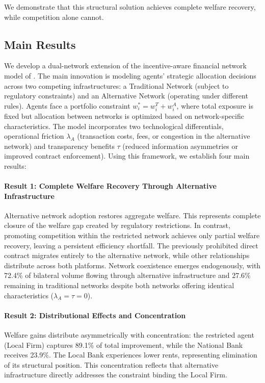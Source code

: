 \documentclass[12pt]{article}
\begin{document}
We demonstrate that this structural solution achieves complete welfare recovery, while competition alone cannot.

\subsection{Main Results}

We develop a dual-network extension of the incentive-aware financial network model of \citet{jalan_incentive-aware_2024}. The main innovation is modeling agents' strategic allocation decisions across two competing infrastructures: a Traditional Network (subject to regulatory constraints) and an Alternative Network (operating under different rules). Agents face a portfolio constraint $w_i^* = w_i^T + w_i^A$, where total exposure is fixed but allocation between networks is optimized based on network-specific characteristics. The model incorporates two technological differentials, operational friction $\lambda_A$ (transaction costs, fees, or congestion in the alternative network) and transparency benefits $\tau$ (reduced information asymmetries or improved contract enforcement). Using this framework, we establish four main results:

\paragraph{Result 1: Complete Welfare Recovery Through Alternative Infrastructure}

Alternative network adoption restores aggregate welfare. This represents complete closure of the welfare gap created by regulatory restrictions. In contrast, promoting competition within the restricted network achieves only partial welfare recovery, leaving a persistent efficiency shortfall. The previously prohibited direct contract migrates entirely to the alternative network, while other relationships distribute across both platforms. Network coexistence emerges endogenously, with 72.4\% of bilateral volume flowing through alternative infrastructure and 27.6\% remaining in traditional networks despite both networks offering identical characteristics ($\lambda_A = \tau = 0$).

\paragraph{Result 2: Distributional Effects and Concentration}

Welfare gains distribute asymmetrically with concentration: the restricted agent (Local Firm) captures 89.1\% of total improvement, while the National Bank receives 23.9\%. The Local Bank experiences lower rents, representing elimination of its structural position. This concentration reflects that alternative infrastructure directly addresses the constraint binding the Local Firm.
\end{document}
